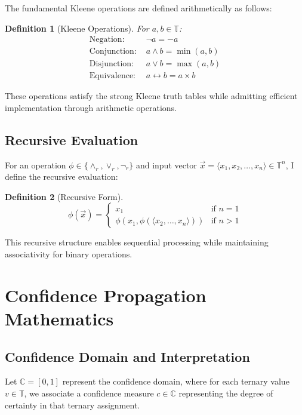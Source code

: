 \documentclass[11pt,a4paper]{article}
\newtheorem{definition}{Definition}
\begin{document}
The fundamental Kleene operations are defined arithmetically as follows:

\begin{definition}[Kleene Operations]
For $a, b \in \mathbb{T}$:
\begin{align}
\text{Negation: } &\neg a = -a \\
\text{Conjunction: } &a \land b = \min(a, b) \\
\text{Disjunction: } &a \lor b = \max(a, b) \\
\text{Equivalence: } &a \leftrightarrow b = a \times b
\end{align}
\end{definition}

These operations satisfy the strong Kleene truth tables while admitting efficient implementation through arithmetic operations.

\subsection{Recursive Evaluation}

For an operation $\phi \in \{\land_r, \lor_r, \neg_r\}$ and input vector $\vec{x} = \langle x_1, x_2, \ldots, x_n \rangle \in \mathbb{T}^n$, I define the recursive evaluation:

\begin{definition}[Recursive Form]
\begin{equation}
\phi(\vec{x}) = \begin{cases}
x_1 & \text{if } n = 1 \\
\phi(x_1, \phi(\langle x_2, \ldots, x_n \rangle)) & \text{if } n > 1
\end{cases}
\end{equation}
\end{definition}

This recursive structure enables sequential processing while maintaining associativity for binary operations.

\section{Confidence Propagation Mathematics}

\subsection{Confidence Domain and Interpretation}

Let $\mathbb{C} = [0, 1]$ represent the confidence domain, where for each ternary value $v \in \mathbb{T}$, we associate a confidence measure $c \in \mathbb{C}$ representing the degree of certainty in that ternary assignment.
\end{document}
